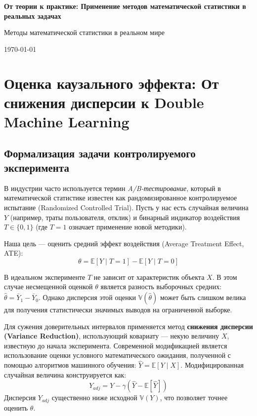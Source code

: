 \documentclass[12pt, a4paper]{article}
\begin{document}
\begin{titlepage}
    \begin{center}
        \vspace*{5cm}
        \Huge
        \textbf{От теории к практике: Применение методов математической статистики в реальных задачах}
        
        \vspace{1.5cm}
        \Large
        Методы математической статистики в реальном мире
        
        \vfill
        \normalsize
        \today
    \end{center}
\end{titlepage}

\tableofcontents
\newpage

\section{Оценка каузального эффекта: От снижения дисперсии к Double Machine Learning}

\subsection{Формализация задачи контролируемого эксперимента}
В индустрии часто используется термин \textit{A/B-тестирование}, который в математической статистике известен как рандомизированное контролируемое испытание (Randomized Controlled Trial). Пусть у нас есть случайная величина $Y$ (например, траты пользователя, отклик) и бинарный индикатор воздействия $T \in \{0, 1\}$ (где $T=1$ означает применение новой методики). 

Наша цель — оценить средний эффект воздействия (Average Treatment Effect, ATE):
$$\theta = \mathbb{E}[Y \mid T=1] - \mathbb{E}[Y \mid T=0]$$

В идеальном эксперименте $T$ не зависит от характеристик объекта $X$. В этом случае несмещенной оценкой $\theta$ является разность выборочных средних: $\hat{\theta} = \bar{Y}_1 - \bar{Y}_0$. Однако дисперсия этой оценки $\mathbb{V}(\hat{\theta})$ может быть слишком велика для получения статистически значимых выводов на ограниченной выборке. 

Для сужения доверительных интервалов применяется метод \textbf{снижения дисперсии (Variance Reduction)}, использующий ковариату — некую величину $X$, известную до начала эксперимента. Современной модификацией является использование оценки условного математического ожидания, полученной с помощью алгоритмов машинного обучения: $\hat{Y} = \mathbb{E}[Y \mid X]$. Модифицированная случайная величина конструируется как:
$$Y_{adj} = Y - \gamma (\hat{Y} - \mathbb{E}[\hat{Y}])$$
Дисперсия $Y_{adj}$ существенно ниже исходной $\mathbb{V}(Y)$, что позволяет точнее оценить $\theta$.
\end{document}
